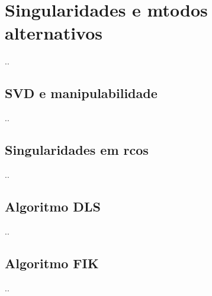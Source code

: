 \chapter{\label{chap::sing}Singularidades e mtodos alternativos}

..

\section{SVD e manipulabilidade}

..

\section{Singularidades em rcos}

..

\section{Algoritmo DLS}

..

\section{Algoritmo FIK}

..



